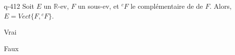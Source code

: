 \begin{truefalse}{q-412}
Soit $E$ un $\mathbb R$-ev, $F$ un sous-ev, et ${}^c F$ le complémentaire de de $F$. Alors, $E = Vect\{F,{}^c F\}$.
\item* Vrai
\item Faux
\end{truefalse}

